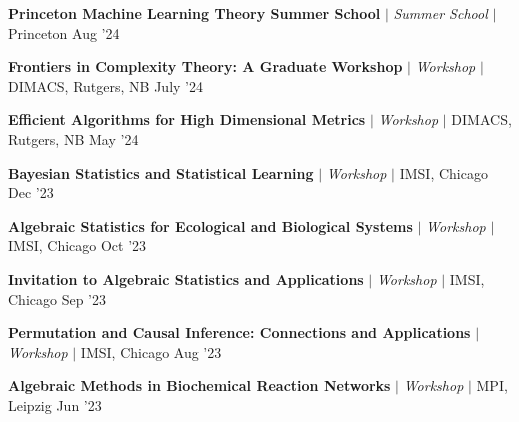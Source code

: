 
\resumeProjectHeading
{\textbf{Princeton Machine Learning Theory Summer School} $|$ \textit{\color{gray}Summer School} $|$ Princeton}
{Aug '24}
{}
\vspace{\mygap}


\resumeProjectHeading
{\textbf{Frontiers in Complexity Theory: A Graduate Workshop} $|$ \textit{\color{gray}Workshop} $|$ DIMACS, Rutgers, NB}
{July '24}
{}
\vspace{\mygap}

\resumeProjectHeading
{\textbf{Efficient Algorithms for High Dimensional Metrics} $|$ \textit{\color{gray}Workshop} $|$ DIMACS, Rutgers, NB}
{May '24}
{}
\vspace{\mygap}

\resumeProjectHeading
{\textbf{Bayesian Statistics and Statistical Learning} $|$ \textit{\color{gray}Workshop} $|$ IMSI, Chicago}
{Dec '23}
{}
\vspace{\mygap}

\resumeProjectHeading
{\textbf{Algebraic Statistics for Ecological and Biological Systems} $|$ \textit{\color{gray}Workshop}  $|$ IMSI, Chicago}
{Oct '23}
{}
\vspace{\mygap}


\resumeProjectHeading
{\textbf{Invitation to Algebraic Statistics and Applications} $|$ \textit{\color{gray}Workshop}  $|$ IMSI, Chicago}
{{Sep '23}}
{}
\vspace{\mygap}

\resumeProjectHeading
{\textbf{Permutation and Causal Inference: Connections and Applications} $|$ \textit{\color{gray}Workshop} $|$ IMSI, Chicago}
{{Aug '23}}
{}
\vspace{\mygap}

\resumeProjectHeading
{\textbf{Algebraic Methods in Biochemical Reaction Networks} $|$ \textit{\color{gray}Workshop}  $|$ MPI, Leipzig}
{{Jun '23}}
{}

